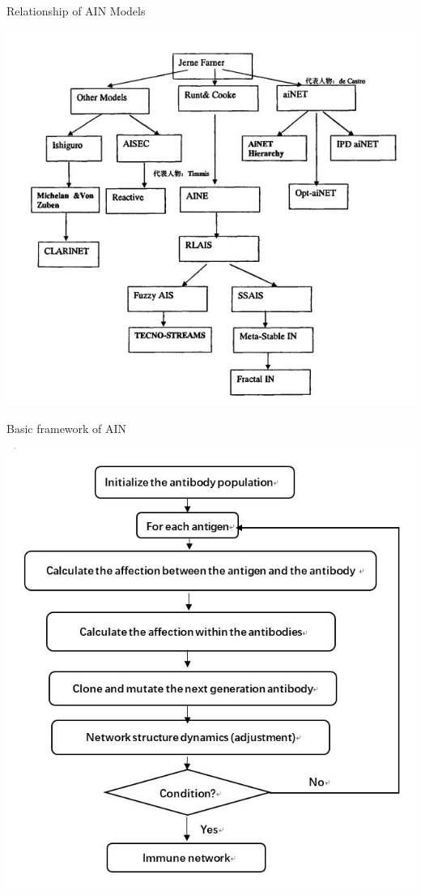 \begin{frame}{Relationship of AIN Models}
\begin{center}
\includegraphics[scale=0.64]{img/relationship_of_AIN.JPG}
\end{center}
\end{frame}


\begin{frame}{Basic framework of AIN}
\begin{center}
\includegraphics[scale=0.55]{img/basic_framework_of_AIN.JPG}    
\end{center}
\end{frame}

